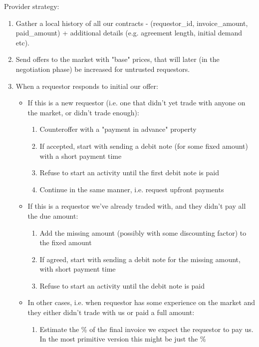 \documentclass{article}
\begin{document}
Provider strategy:
\begin{enumerate}
    \item Gather a local history of all our contracts - (requestor\_id, invoice\_amount, paid\_amount) + additional details (e.g. agreement length, initial demand etc).
    \item Send offers to the market with "base" prices, that will later (in the negotiation phase) be increased for untrusted requestors.
    \item When a requestor responds to initial our offer:
        \begin{itemize}
            \item If this is a new requestor (i.e. one that didn't yet trade with anyone on the market, or didn't trade enough):
                \begin{enumerate}
                    \item Counteroffer with a "payment in advance" property
                    \item If accepted, start with sending a debit note (for some fixed amount) with a short payment time
                    \item Refuse to start an activity until the first debit note is paid
                    \item Continue in the same manner, i.e. request upfront payments
                \end{enumerate}
            \item If this is a requestor we've already traded with, and they didn't pay all the due amount:
                \begin{enumerate}
                    \item Add the missing amount (possibly with some discounting factor) to the fixed amount
                    \item If agreed, start with sending a debit note for the missing amount, with short payment time
                    \item Refuse to start an activity until the debit note is paid
                \end{enumerate}
            \item In other cases, i.e. when requestor has some experience on the market and they either didn't trade with us or paid a full amount:
                \begin{enumerate}
                    \item Estimate the \% of the final invoice we expect the requestor to pay us. In the most primitive version this might be just the \%

\end{enumerate}
\end{itemize}
\end{enumerate}
\end{document}
